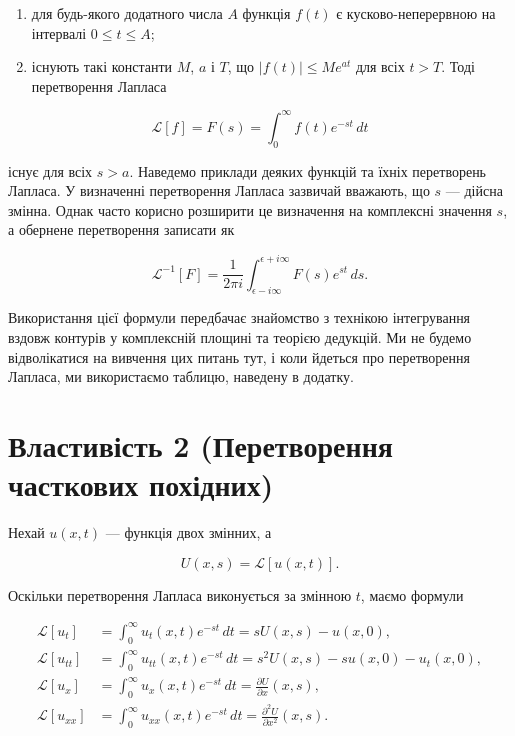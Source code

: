 \documentclass[
  ukrainian,
]{article}
\providecommand{\tightlist}{%
  \setlength{\itemsep}{0pt}\setlength{\parskip}{0pt}}
\begin{document}
\begin{enumerate}
\def\labelenumi{\arabic{enumi}.}
\tightlist
\item
  для будь-якого додатного числа \(A\) функція \(f(t)\) є
  кусково-неперервною на інтервалі \(0 \le t \le A\);
\item
  існують такі константи \(M\), \(a\) і \(T\), що \(|f(t)| \le Me^{at}\)
  для всіх \(t > T\). Тоді перетворення Лапласа
\end{enumerate}

\[
\mathscr{L}[f] = F(s) = \int_0^\infty f(t)e^{-st}\,dt
\]

існує для всіх \(s > a\). Наведемо приклади деяких функцій та їхніх
перетворень Лапласа. У визначенні перетворення Лапласа зазвичай
вважають, що \(s\) --- дійсна змінна. Однак часто корисно розширити це
визначення на комплексні значення \(s\), а обернене перетворення
записати як

\[
\mathscr{L}^{-1}[F] = \frac{1}{2\pi i} \int_{\epsilon - i\infty}^{\epsilon + i\infty} F(s)e^{st}\,ds.
\]

Використання цієї формули передбачає знайомство з технікою інтегрування
вздовж контурів у комплексній площині та теорією дедукцій. Ми не будемо
відволікатися на вивчення цих питань тут, і коли йдеться про
перетворення Лапласа, ми використаємо таблицю, наведену в додатку.

\section{Властивість 2 (Перетворення часткових
похідних)}\label{ux432ux43bux430ux441ux442ux438ux432ux456ux441ux442ux44c-2-ux43fux435ux440ux435ux442ux432ux43eux440ux435ux43dux43dux44f-ux447ux430ux441ux442ux43aux43eux432ux438ux445-ux43fux43eux445ux456ux434ux43dux438ux445}

Нехай \(u(x,t)\) --- функція двох змінних, а

\[
U(x,s)=\mathcal{L}\!\left[u(x,t)\right].
\]

Оскільки перетворення Лапласа виконується за змінною \(t\), маємо
формули

\[
\begin{aligned}
\mathcal{L}\!\left[u_t\right]
&=\int_0^\infty u_t(x,t)e^{-st}\,dt
=sU(x,s)-u(x,0),\\
\mathcal{L}\!\left[u_{tt}\right]
&=\int_0^\infty u_{tt}(x,t)e^{-st}\,dt
=s^2U(x,s)-su(x,0)-u_t(x,0),\\
\mathcal{L}\!\left[u_x\right]
&=\int_0^\infty u_x(x,t)e^{-st}\,dt
=\frac{\partial U}{\partial x}(x,s),\\
\mathcal{L}\!\left[u_{xx}\right]
&=\int_0^\infty u_{xx}(x,t)e^{-st}\,dt
=\frac{\partial^2 U}{\partial x^2}(x,s).
\end{aligned}
\]
\end{document}
